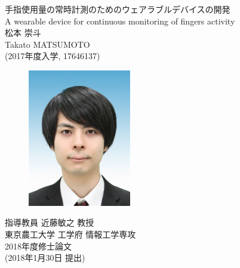 \thispagestyle{empty}
\begin{center}
	{\Huge 手指使用量の常時計測のためのウェアラブルデバイスの開発}\\
	\vspace{2mm}
	{\Large A wearable device for continuous monitoring of fingers activity}\\
	\vspace{7mm}
	{\Huge 松本 崇斗}\\
	\vspace{2mm}
	{\Large Takato MATSUMOTO}\\
	\vspace{10mm}
	{\Large (2017年度入学, 17646137)}\\
	\vspace{25mm}

	\begin{figure}[H]
		\begin{center}
			\vspace{7mm}
			\includegraphics[width=45mm]{face_photo.jpg}
		\end{center}
	\end{figure}

	\vspace{25mm}
	{\Huge 指導教員 近藤敏之 教授}\\
	\vspace{12mm}
	{\Large 東京農工大学 工学府 情報工学専攻}\\
	\vspace{2mm}
	{\Large 2018年度修士論文}\\
	\vspace{2mm}
	{\Large (2018年1月30日 提出)}\\
\end{center}